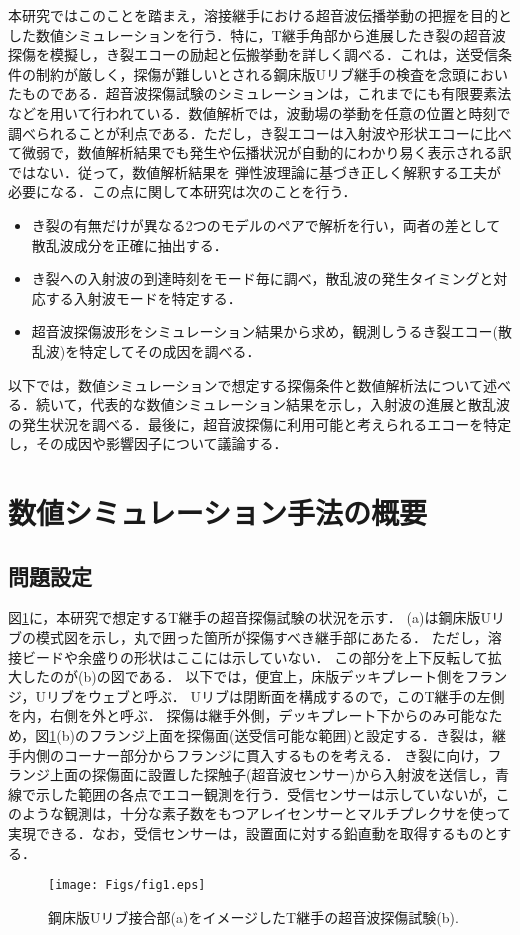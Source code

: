 \documentclass{jsce}
\begin{document}
本研究ではこのことを踏まえ，溶接継手における超音波伝播挙動の把握を目的とした数値シミュレーションを行う．特に，T継手角部から進展したき裂の超音波探傷を模擬し，き裂エコーの励起と伝搬挙動を詳しく調べる．これは，送受信条件の制約が厳しく，探傷が難しいとされる鋼床版Uリブ継手の検査を念頭においたものである．超音波探傷試験のシミュレーションは，これまでにも有限要素法などを用いて行われている．数値解析では，波動場の挙動を任意の位置と時刻で調べられることが利点である．ただし，き裂エコーは入射波や形状エコーに比べて微弱で，数値解析結果でも発生や伝播状況が自動的にわかり易く表示される訳ではない．従って，数値解析結果を
弾性波理論に基づき正しく解釈する工夫が必要になる．この点に関して本研究は次のことを行う．
\begin{itemize}
\item
	き裂の有無だけが異なる2つのモデルのペアで解析を行い，両者の差として散乱波成分を正確に抽出する．
\item
	き裂への入射波の到達時刻をモード毎に調べ，散乱波の発生タイミングと対応する入射波モードを特定する．
\item
	超音波探傷波形をシミュレーション結果から求め，観測しうるき裂エコー(散乱波)を特定してその成因を調べる．
\end{itemize}
以下では，数値シミュレーションで想定する探傷条件と数値解析法について述べる．続いて，代表的な数値シミュレーション結果を示し，入射波の進展と散乱波の発生状況を調べる．最後に，超音波探傷に利用可能と考えられるエコーを特定し，その成因や影響因子について議論する．
\section{数値シミュレーション手法の概要}
\subsection{問題設定}
図\ref{fig:fig1}に，本研究で想定するT継手の超音探傷試験の状況を示す．
(a)は鋼床版Uリブの模式図を示し，丸で囲った箇所が探傷すべき継手部にあたる．
ただし，溶接ビードや余盛りの形状はここには示していない．
この部分を上下反転して拡大したのが(b)の図である．
以下では，便宜上，床版デッキプレート側をフランジ，Uリブをウェブと呼ぶ．
Uリブは閉断面を構成するので，このT継手の左側を内，右側を外と呼ぶ．
探傷は継手外側，デッキプレート下からのみ可能なため，図\ref{fig:fig1}(b)のフランジ上面を探傷面(送受信可能な範囲)と設定する．き裂は，継手内側のコーナー部分からフランジに貫入するものを考える．
き裂に向け，フランジ上面の探傷面に設置した探触子(超音波センサー)から入射波を送信し，青線で示した範囲の各点でエコー観測を行う．受信センサーは示していないが，このような観測は，十分な素子数をもつアレイセンサーとマルチプレクサを使って実現できる．なお，受信センサーは，設置面に対する鉛直動を取得するものとする．
\begin{figure}[h]
	\begin{center}
	\texttt{[image: Figs/fig1.eps]} 
	\end{center}
	\caption{
		鋼床版Uリブ接合部(a)をイメージしたT継手の超音波探傷試験(b).
	} 
	\label{fig:fig1}
\end{figure}
\end{document}
